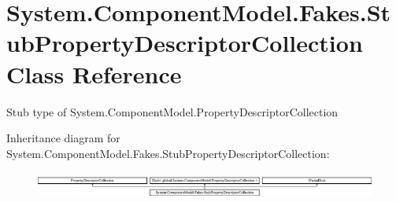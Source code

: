 \hypertarget{class_system_1_1_component_model_1_1_fakes_1_1_stub_property_descriptor_collection}{\section{System.\-Component\-Model.\-Fakes.\-Stub\-Property\-Descriptor\-Collection Class Reference}
\label{class_system_1_1_component_model_1_1_fakes_1_1_stub_property_descriptor_collection}
}


Stub type of System.\-Component\-Model.\-Property\-Descriptor\-Collection 


Inheritance diagram for System.\-Component\-Model.\-Fakes.\-Stub\-Property\-Descriptor\-Collection\-:\begin{figure}[H]
\begin{center}
\leavevmode
\includegraphics[height=0.888889cm]{class_system_1_1_component_model_1_1_fakes_1_1_stub_property_descriptor_collection}
\end{center}
\end{figure}
